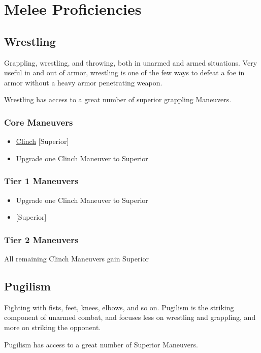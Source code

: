 \documentclass[oneside,11pt,english]{book}
\begin{document}
\section{Melee Proficiencies}
\subsection{Wrestling} %
Grappling, wrestling, and throwing, both in unarmed and armed situations. Very
useful in and out of armor, wrestling is one of the few ways to defeat a foe in
armor without a heavy armor penetrating weapon.  

Wrestling has access to a great number of superior grappling Maneuvers. 

\subsubsection{Core Maneuvers}
\vspace{-5pt}\begin{itemize}
  [itemsep=0.5mm]
\item \hyperref[man:Clinch (Attack)]{Clinch} [Superior]
\item Upgrade one Clinch Maneuver to Superior
\end{itemize}
\subsubsection{Tier 1 Maneuvers}
\vspace{-5pt}\begin{itemize}
  [itemsep=0.5mm]
\item Upgrade one Clinch Maneuver to Superior
\item {} [Superior]
\end{itemize}
\subsubsection{Tier 2 Maneuvers}
All remaining Clinch Maneuvers gain Superior

\subsection{Pugilism}
Fighting with fists, feet, knees, elbows, and so on. Pugilism is the striking
component of unarmed combat, and focuses less on wrestling and grappling, and
more on striking the opponent.  

Pugilism has access to a great number of Superior Maneuvers. 
\end{document}
